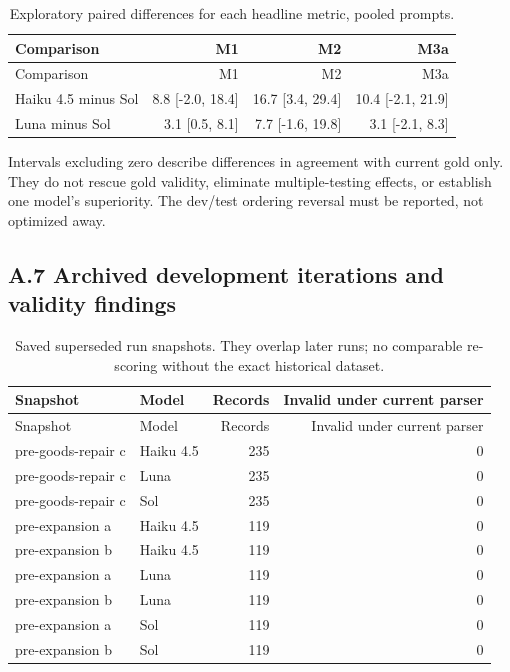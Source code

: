 \begingroup\small\setlength{\tabcolsep}{4pt}
\begin{longtable}{lrrr}
\caption{Exploratory paired differences for each headline metric, pooled prompts.}\\
\toprule
Comparison & M1 & M2 & M3a \\
\midrule\endfirsthead
\toprule
Comparison & M1 & M2 & M3a \\
\midrule\endhead
\bottomrule\endfoot
Haiku 4.5 minus Sol & 8.8 [-2.0, 18.4] & 16.7 [3.4, 29.4] & 10.4 [-2.1, 21.9] \\
Luna minus Sol & 3.1 [0.5, 8.1] & 7.7 [-1.6, 19.8] & 3.1 [-2.1, 8.3] \\
\end{longtable}\endgroup


Intervals excluding zero describe differences in agreement with current gold only. They do not rescue gold validity, eliminate multiple-testing effects, or establish one model's superiority. The dev/test ordering reversal must be reported, not optimized away.

\subsection*{A.7 Archived development iterations and validity findings}

\begingroup\small\setlength{\tabcolsep}{4pt}
\begin{longtable}{llrr}
\caption{Saved superseded run snapshots. They overlap later runs; no comparable re-scoring without the exact historical dataset.}\\
\toprule
Snapshot & Model & Records & Invalid under current parser \\
\midrule\endfirsthead
\toprule
Snapshot & Model & Records & Invalid under current parser \\
\midrule\endhead
\bottomrule\endfoot
pre-goods-repair c & Haiku 4.5 & 235 & 0 \\
pre-goods-repair c & Luna & 235 & 0 \\
pre-goods-repair c & Sol & 235 & 0 \\
pre-expansion a & Haiku 4.5 & 119 & 0 \\
pre-expansion b & Haiku 4.5 & 119 & 0 \\
pre-expansion a & Luna & 119 & 0 \\
pre-expansion b & Luna & 119 & 0 \\
pre-expansion a & Sol & 119 & 0 \\
pre-expansion b & Sol & 119 & 0 \\
\end{longtable}\endgroup


